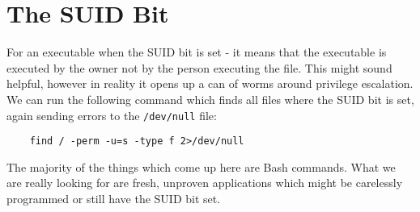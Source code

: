 \section{The SUID Bit}
For an executable when the SUID bit is set - it means that the executable is executed by the owner not by the person executing the file. This might sound helpful, however in reality it opens up a can of worms around privilege escalation. \\

We can run the following command which finds all files where the SUID bit is set, again sending errors to the \verb|/dev/null| file:
\begin{verbatim}
    find / -perm -u=s -type f 2>/dev/null
\end{verbatim}

The majority of the things which come up here are Bash commands. What we are really looking for are fresh, unproven applications which might be carelessly programmed or still have the SUID bit set. 
